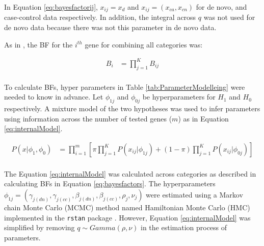 \documentclass[]{article}
\begin{document}
In Equation \ref{eq:bayesfactorij}, $x_{ij} = x_d$ and $x_{ij} =
(x_{ca}, x_{cn})$  for de novo, and  case-control data
respectively. In addition, the integral across $q$ was not used for de
novo data because there was not this parameter in de novo data.

As in \cite{he2013integrated}, the BF for the $i^{th}$ gene for combining all categories was:

\begin{equation}
\begin{array}{ll}
B_{i} & =  \prod \limits_{j=1}^{K} B_{ij} \\
\end{array}
\label{eq:bayesfactors}
\end{equation}




To calculate BFs, hyper parameters in Table \ref{tab:ParameterModelleing} were needed to know in advance.
Let $\phi_{1j}$ and $\phi_{0j}$ be hyperparameters for $H_1$ and $H_0$ respectively.
A mixture model of the two hypotheses was used to infer
parameters using information across the number of tested genes ($m$) as
in Equation \ref{eq:internalModel}.

\begin{equation} \label{eq:internalModel}
\begin{array}{ll}
P(x|\phi_1, \phi_0) & = \prod \limits_{i=1}^{m} \left[ \pi \prod \limits_{j=1}^{K} P(x_{ij}|\phi_{1j}) + (1 - \pi) \prod \limits_{j=1}^{K} P(x_{ij}|\phi_{0j}) \right] \\
\end{array}
\end{equation}


The Equation \ref{eq:internalModel} was calculated across categories as
%
%
described in calculating BFs in Equation \ref{eq:bayesfactors}.
The hyperparameters $\phi_{1j} = (\gamma_{j(dn)}, \gamma_{j(cc)},
\beta_{j(dn)}, \beta_{j(cc)}, \rho_j, \nu_j) $ were estimated using a Markov chain
Monte Carlo (MCMC) method named Hamiltonian Monte Carlo (HMC)
implemented in the \texttt{rstan} package \citep{carpenter2015stan, r323manual}. However, Equation \ref{eq:internalModel} was simplified by removing $q \sim Gamma(\rho, \nu)$ in the estimation process of parameters.
\end{document}
